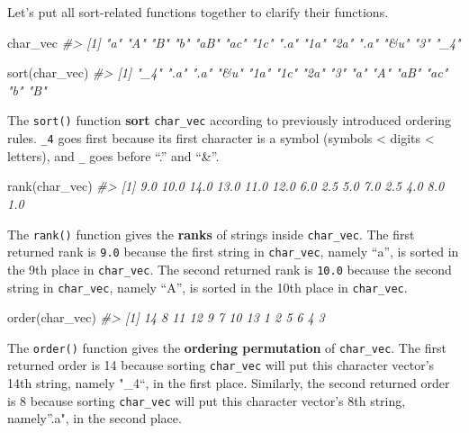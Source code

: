\documentclass[
]{book}
\newenvironment{Shaded}{\begin{snugshade}}{\end{snugshade}}
\newcommand{\CommentTok}[1]{\textcolor[rgb]{0.56,0.35,0.01}{\textit{#1}}}
\newcommand{\FunctionTok}[1]{\textcolor[rgb]{0.00,0.00,0.00}{#1}}
\newcommand{\NormalTok}[1]{#1}
\begin{document}
Let's put all sort-related functions together to clarify their functions.

\begin{Shaded}
\begin{Highlighting}[]
\NormalTok{char\_vec}
\CommentTok{\#\textgreater{}  [1] "a"  "A"  "B"  "b"  "aB" "ac" "1c" ".a" "1a" "2a" ".a" "\&u" "3"  "\_4"}
\end{Highlighting}
\end{Shaded}

\begin{Shaded}
\begin{Highlighting}[]
\FunctionTok{sort}\NormalTok{(char\_vec)}
\CommentTok{\#\textgreater{}  [1] "\_4" ".a" ".a" "\&u" "1a" "1c" "2a" "3"  "a"  "A"  "aB" "ac" "b"  "B"}
\end{Highlighting}
\end{Shaded}

The \texttt{sort()} function \textbf{sort} \texttt{char\_vec} according to previously introduced ordering rules. \texttt{\_4} goes first because its first character is a symbol (symbols \textless{} digits \textless{} letters), and \texttt{\_} goes before ``.'' and ``\&''.

\begin{Shaded}
\begin{Highlighting}[]
\FunctionTok{rank}\NormalTok{(char\_vec)}
\CommentTok{\#\textgreater{}  [1]  9.0 10.0 14.0 13.0 11.0 12.0  6.0  2.5  5.0  7.0  2.5  4.0  8.0  1.0}
\end{Highlighting}
\end{Shaded}

The \texttt{rank()} function gives the \textbf{ranks} of strings inside \texttt{char\_vec}. The first returned rank is \texttt{9.0} because the first string in \texttt{char\_vec}, namely ``a'', is sorted in the 9th place in \texttt{char\_vec}. The second returned rank is \texttt{10.0} because the second string in \texttt{char\_vec}, namely ``A'', is sorted in the 10th place in \texttt{char\_vec}.

\begin{Shaded}
\begin{Highlighting}[]
\FunctionTok{order}\NormalTok{(char\_vec)}
\CommentTok{\#\textgreater{}  [1] 14  8 11 12  9  7 10 13  1  2  5  6  4  3}
\end{Highlighting}
\end{Shaded}

The \texttt{order()} function gives the \textbf{ordering permutation} of \texttt{char\_vec}. The first returned order is 14 because sorting \texttt{char\_vec} will put this character vector's 14th string, namely "\_4``, in the first place. Similarly, the second returned order is 8 because sorting \texttt{char\_vec} will put this character vector's 8th string, namely''.a", in the second place.
\end{document}
